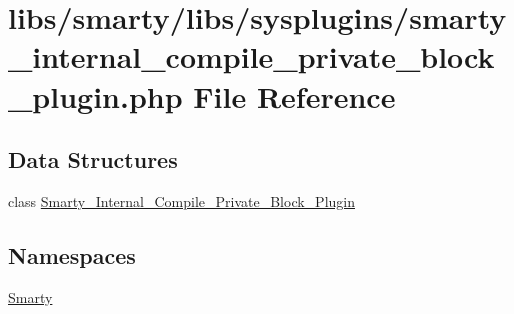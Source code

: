 \hypertarget{smarty__internal__compile__private__block__plugin_8php}{}\section{libs/smarty/libs/sysplugins/smarty\+\_\+internal\+\_\+compile\+\_\+private\+\_\+block\+\_\+plugin.php File Reference}
\label{smarty__internal__compile__private__block__plugin_8php}
\subsection*{Data Structures}
\begin{DoxyCompactItemize}
\item 
class \hyperlink{class_smarty___internal___compile___private___block___plugin}{Smarty\+\_\+\+Internal\+\_\+\+Compile\+\_\+\+Private\+\_\+\+Block\+\_\+\+Plugin}
\end{DoxyCompactItemize}
\subsection*{Namespaces}
\begin{DoxyCompactItemize}
\item 
 \hyperlink{namespace_smarty}{Smarty}
\end{DoxyCompactItemize}
